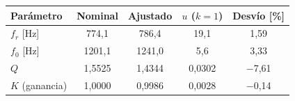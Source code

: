 \begin{tabular}{@{}lcccc@{}}
\toprule
Parámetro & Nominal & Ajustado & $u$ ($k=1$) & Desvío [\%] \\
\midrule
$f_r$ [Hz] & 774{,}1 & 786{,}4 & 19{,}1 & 1{,}59 \\
$f_0$ [Hz] & 1201{,}1 & 1241{,}0 & 5{,}6 & 3{,}33 \\
$Q$ & 1{,}5525 & 1{,}4344 & 0{,}0302 & $-$7{,}61 \\
$K$ (ganancia) & 1{,}0000 & 0{,}9986 & 0{,}0028 & $-$0{,}14 \\
\bottomrule
\end{tabular}
